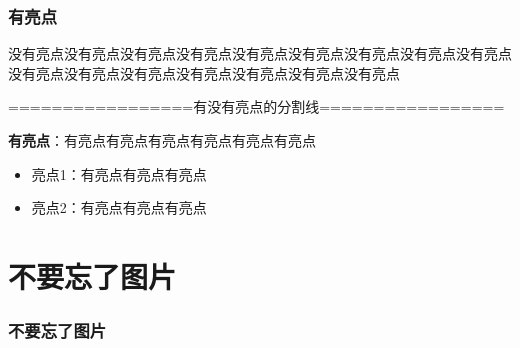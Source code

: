 \documentclass[AutoFakeBold]{beamer}
\begin{document}
{    \begin{frame}
        \frametitle{有亮点}
    
        没有亮点没有亮点没有亮点没有亮点没有亮点没有亮点没有亮点没有亮点没有亮点没有亮点没有亮点没有亮点没有亮点没有亮点没有亮点没有亮点

        \begin{center}
            =================有没有亮点的分割线=================
        \end{center}

        \textbf{有亮点}：有亮点有亮点有亮点有亮点有亮点有亮点

        \begin{itemize}
            \item 亮点1：有亮点有亮点有亮点
            \item 亮点2：有亮点有亮点有亮点
        \end{itemize}
    
    \end{frame}

    \section{不要忘了图片}

    \begin{frame}
        \frametitle{不要忘了图片}
    
        \begin{figure}
        \end{figure}
    

\end{frame}}
\end{document}
